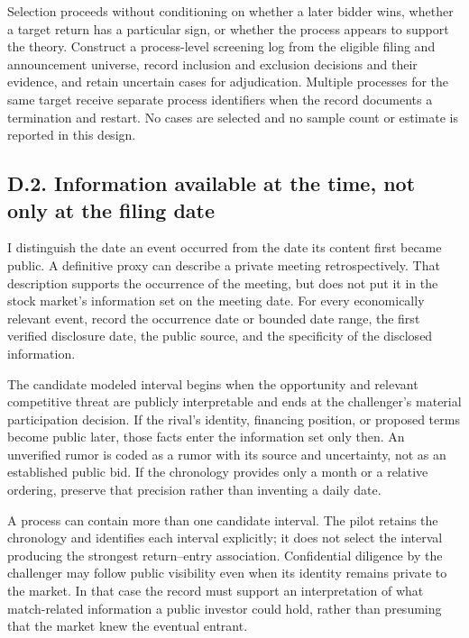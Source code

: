 \documentclass[
  11pt,
]{article}
\begin{document}
Selection proceeds without conditioning on whether a later bidder wins,
whether a target return has a particular sign, or whether the process
appears to support the theory. Construct a process-level screening log
from the eligible filing and announcement universe, record inclusion and
exclusion decisions and their evidence, and retain uncertain cases for
adjudication. Multiple processes for the same target receive separate
process identifiers when the record documents a termination and restart.
No cases are selected and no sample count or estimate is reported in
this design.

\subsection{D.2. Information available at the time, not only at the
filing date}\label{oa-d-information}

I distinguish the date an event occurred from the date its content first
became public. A definitive proxy can describe a private meeting
retrospectively. That description supports the occurrence of the
meeting, but does not put it in the stock market's information set on
the meeting date. For every economically relevant event, record the
occurrence date or bounded date range, the first verified disclosure
date, the public source, and the specificity of the disclosed
information.

The candidate modeled interval begins when the opportunity and relevant
competitive threat are publicly interpretable and ends at the
challenger's material participation decision. If the rival's identity,
financing position, or proposed terms become public later, those facts
enter the information set only then. An unverified rumor is coded as a
rumor with its source and uncertainty, not as an established public bid.
If the chronology provides only a month or a relative ordering, preserve
that precision rather than inventing a daily date.

A process can contain more than one candidate interval. The pilot
retains the chronology and identifies each interval explicitly; it does
not select the interval producing the strongest return--entry
association. Confidential diligence by the challenger may follow public
visibility even when its identity remains private to the market. In that
case the record must support an interpretation of what match-related
information a public investor could hold, rather than presuming that the
market knew the eventual entrant.
\end{document}
